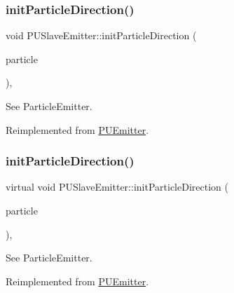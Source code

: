 \subsubsection{\texorpdfstring{init\+Particle\+Direction()}{initParticleDirection()}\hspace{0.1cm}{\footnotesize\ttfamily [1/2]}}
{\footnotesize\ttfamily void P\+U\+Slave\+Emitter\+::init\+Particle\+Direction (\begin{DoxyParamCaption}\item[{\hyperlink{structPUParticle3D}{P\+U\+Particle3D} $\ast$}]{particle }\end{DoxyParamCaption})\hspace{0.3cm}{\ttfamily [override]}, {\ttfamily [virtual]}}

See Particle\+Emitter. 

Reimplemented from \hyperlink{classPUEmitter_a0dffa0a17008ddaaec73c6042ea1a019}{P\+U\+Emitter}.

\mbox{\label{classPUSlaveEmitter_a80d517e16cea272c8b762d7b6e237868}} 
\subsubsection{\texorpdfstring{init\+Particle\+Direction()}{initParticleDirection()}\hspace{0.1cm}{\footnotesize\ttfamily [2/2]}}
{\footnotesize\ttfamily virtual void P\+U\+Slave\+Emitter\+::init\+Particle\+Direction (\begin{DoxyParamCaption}\item[{\hyperlink{structPUParticle3D}{P\+U\+Particle3D} $\ast$}]{particle }\end{DoxyParamCaption})\hspace{0.3cm}{\ttfamily [override]}, {\ttfamily [virtual]}}

See Particle\+Emitter. 

Reimplemented from \hyperlink{classPUEmitter_a0dffa0a17008ddaaec73c6042ea1a019}{P\+U\+Emitter}.

\mbox{\label{classPUSlaveEmitter_a91be8151129e78b9a1a06a67ff67c640}} 
